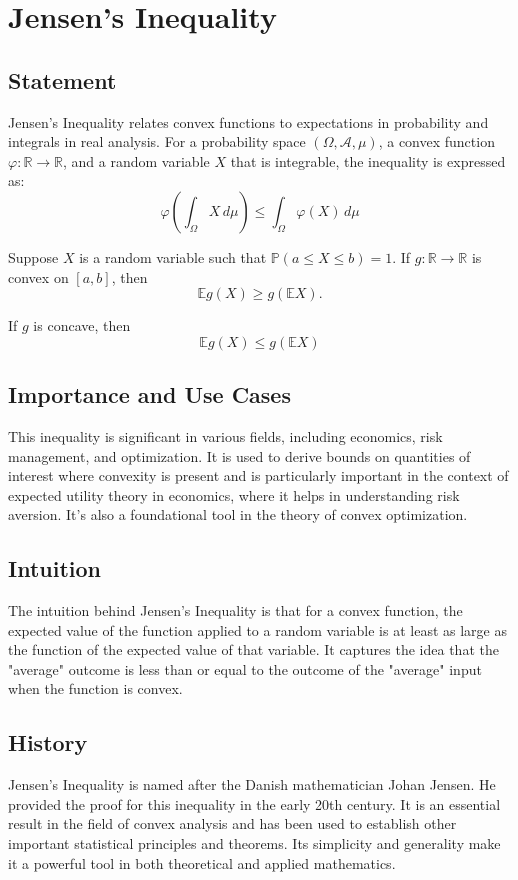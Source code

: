 \documentclass{article}
\begin{document}
\section{Jensen's Inequality}

\subsection{Statement}
Jensen's Inequality relates convex functions to expectations in probability and integrals in real analysis. For a probability space \((\Omega, \mathcal{A}, \mu)\), a convex function \(\varphi: \mathbb{R} \rightarrow \mathbb{R}\), and a random variable \(X\) that is integrable, the inequality is expressed as:
\[ \varphi \left( \int_{\Omega} X \, d\mu \right) \leq \int_{\Omega} \varphi(X) \, d\mu \]

Suppose $X$ is a random variable such that $\mathbb{P}(a \leqslant X \leqslant b)=1$. If $g: \mathbb{R} \longrightarrow \mathbb{R}$ is convex on $[a, b]$, then
$$
\mathbb{E} g(X) \geqslant g(\mathbb{E} X) .
$$

If $g$ is concave, then
$$
\mathbb{E} g(X) \leqslant g(\mathbb{E} X)
$$


\subsection{Importance and Use Cases}
This inequality is significant in various fields, including economics, risk management, and optimization. It is used to derive bounds on quantities of interest where convexity is present and is particularly important in the context of expected utility theory in economics, where it helps in understanding risk aversion. It's also a foundational tool in the theory of convex optimization.

\subsection{Intuition}
The intuition behind Jensen's Inequality is that for a convex function, the expected value of the function applied to a random variable is at least as large as the function of the expected value of that variable. It captures the idea that the "average" outcome is less than or equal to the outcome of the "average" input when the function is convex.

\subsection{History}
Jensen's Inequality is named after the Danish mathematician Johan Jensen. He provided the proof for this inequality in the early 20th century. It is an essential result in the field of convex analysis and has been used to establish other important statistical principles and theorems. Its simplicity and generality make it a powerful tool in both theoretical and applied mathematics.
\end{document}
